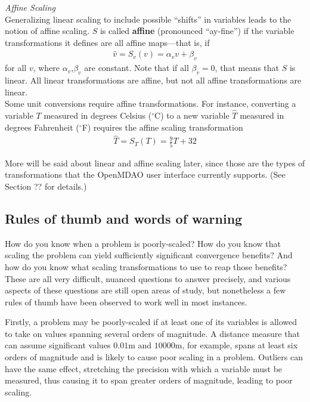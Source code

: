 \documentclass{article}
\begin{document}
\noindent \textit{Affine Scaling} \\

\noindent
Generalizing linear scaling to include possible ``shifts'' in variables leads to the notion of affine scaling. $S$ is called \textbf{affine} (pronounced ``ay-fine'') if the variable transformations it defines are all affine maps---that is, if
\begin{align*}
    \hat{v} = S_v(v) = \alpha_v v + \beta_v
\end{align*}
for all $v$, where $\alpha_v$,$\beta_v$ are constant. Note that if all $\beta_v = 0$, that means that $S$ is linear. All linear transformations are affine, but not all affine transformations are linear. \\

\noindent
Some unit conversions require affine transformations. For instance, converting a variable $T$ measured in degrees Celsius ($^{\circ}$C) to a new variable $\hat{T}$ measured in degrees Fahrenheit ($^{\circ}$F) requires the affine scaling transformation
\begin{align*}
    \hat{T} = S_T(T) = \frac{9}{5}T + 32
\end{align*}

\noindent
More will be said about linear and affine scaling later, since those are the types of transformations that the OpenMDAO user interface currently supports. (See Section ?? for details.)

\subsection*{Rules of thumb and words of warning}

How do you know when a problem is poorly-scaled? How do you know that scaling the
problem can yield sufficiently significant convergence benefits? And how do you know what scaling transformations to use to reap those benefits? These are all very difficult, nuanced questions to answer precisely, and various aspects of these questions are still open areas of study, but nonetheless a few rules of thumb have been observed to work well in most instances.

Firstly, a problem may be poorly-scaled if at least one of its variables is allowed to take on values spanning several orders of magnitude. A distance measure that can assume significant values $0.01 \text{m}$ and $10000 \text{m}$, for example, spans at least six orders of magnitude and is likely to cause poor scaling in a problem. Outliers can have the same effect, stretching the precision with which a variable must be measured, thus causing it to span greater orders of magnitude, leading to poor scaling.
\end{document}
